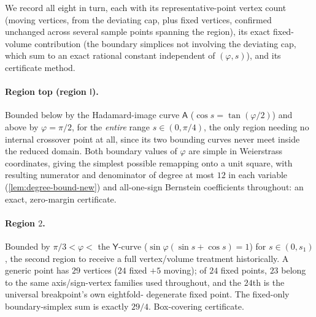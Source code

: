 \documentclass[11pt,reqno]{amsart}
\renewcommand{\_}{\origunderscore\allowbreak}
\numberwithin{equation}{section}
\theoremstyle{plain}
\theoremstyle{definition}
\theoremstyle{remark}
\newcommand{\tilt}{\varphi}                  %
\newcommand{\arcp}{s}                        %
\begin{document}
We record all eight in turn, each with its representative-point vertex
count (moving vertices, from the deviating cap, plus fixed vertices,
confirmed unchanged across several sample points spanning the region),
its exact fixed-volume contribution (the boundary simplices not
involving the deviating cap, which sum to an exact rational constant
independent of $(\tilt,\arcp)$), and its certificate method.

\paragraph{Region top (region $\mathsf I$).} Bounded below by the
Hadamard-image curve $\mathsf A$ ($\cos\arcp=\tan(\tilt/2)$) and above
by $\tilt=\pi/2$, for the \emph{entire} range $\arcp\in(0,\pi/4)$, the
only region needing no internal crossover point at all, since its two
bounding curves never meet inside the reduced domain. Both boundary
values of $\tilt$ are simple in Weierstrass coordinates, giving the
simplest possible remapping onto a unit square, with resulting
numerator and denominator of degree at most $12$ in each variable
(\cref{lem:degree-bound-new}) and all-one-sign Bernstein coefficients
throughout: an exact, zero-margin certificate.

\paragraph{Region $2$.} Bounded by $\pi/3<\tilt<$ the $\mathsf Y$-curve
($\sin\tilt(\sin\arcp+\cos\arcp)=1$) for $\arcp\in(0,\arcp_1)$, the
second region to receive a full vertex/volume treatment historically.
A generic point has $29$ vertices ($24$ fixed $+5$ moving); of $24$
fixed points, $23$ belong to the same axis/sign-vertex families used
throughout, and the $24$th is the universal breakpoint's own eightfold-
degenerate fixed point. The fixed-only boundary-simplex sum is exactly
$29/4$. Box-covering certificate.
\end{document}

